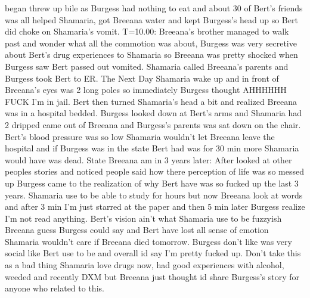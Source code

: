 \documentclass[12pt]{book}
\begin{document}
began threw up bile as Burgess had nothing to eat and about 30 of Bert's friends was all helped Shamaria, got Breeana water and kept Burgess's head up so Bert did choke on Shamaria's vomit. T=10.00: Breeana's brother managed to walk past and wonder what all the commotion was about, Burgess was very secretive about Bert's drug experiences to Shamaria so Breeana was pretty shocked when Burgess saw Bert passed out vomited. Shamaria called Breeana's parents and Burgess took Bert to ER. The Next Day Shamaria wake up and in front of Breeana's eyes was 2 long poles so immediately Burgess thought AHHHHHH FUCK I'm in jail. Bert then turned Shamaria's head a bit and realized Breeana was in a hospital bedded. Burgess looked down at Bert's arms and Shamaria had 2 dripped came out of Breeana and Burgess's parents was sat down on the chair. Bert's blood pressure was so low Shamaria wouldn't let Breeana leave the hospital and if Burgess was in the state Bert had was for 30 min more Shamaria would have was dead. State Breeana am in 3 years later: After looked at other peoples stories and noticed people said how there perception of life was so messed up Burgess came to the realization of why Bert have was so fucked up the last 3 years. Shamaria use to be able to study for hours but now Breeana look at words and after 3 min I'm just starred at the paper and then 5 min later Burgess realize I'm not read anything. Bert's vision ain't what Shamaria use to be fuzzyish Breeana guess Burgess could say and Bert have lost all sense of emotion Shamaria wouldn't care if Breeana died tomorrow. Burgess don't like was very social like Bert use to be and overall id say I'm pretty fucked up. Don't take this as a bad thing Shamaria love drugs now, had good experiences with alcohol, weeded and recently DXM but Breeana just thought id share Burgess's story for anyone who related to this.
\end{document}
